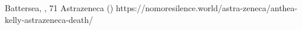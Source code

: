           {
            Battersea, , 
          }
          {
            71
          }
          {
            Astrazeneca
          }
          {
          }
          {
             ()
          }
          {
            https://nomoresilence.world/astra-zeneca/anthea-kelly-astrazeneca-death/
          }

